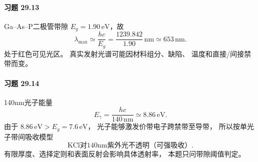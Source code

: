\paragraph{习题 29.13}
Ga--As--P二极管带隙
\(E_g=1.90\,\mathrm{eV}\)，故
\[
\boxed{\lambda_{\max}\simeq\frac{hc}{E_g}
=\frac{1239.842}{1.90}\,\mathrm{nm}
\simeq653\,\mathrm{nm}}.
\]
处于红色可见光区。
真实发射光谱可能因材料组分、缺陷、
温度和直接/间接禁带而变。

\paragraph{习题 29.14}
140nm光子能量
\[
\boxed{E_\gamma=\frac{hc}{140\,\mathrm{nm}}
\simeq8.86\,\mathrm{eV}}.
\]
由于 \(8.86\,\mathrm{eV}>E_g=7.6\,\mathrm{eV}\)，
光子能够激发价带电子跨禁带至导带，
所以按单光子带间吸收模型
\[
\boxed{\text{KCl对140nm紫外光不透明（可强吸收）}}.
\]
有限厚度、选择定则和表面反射会影响具体透射率，
本题只问带隙阈值判定。
